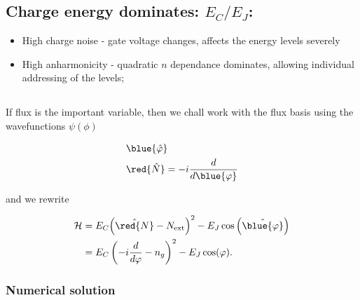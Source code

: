  \subsection{Charge energy dominates: $ E_C/E_J $:}
 \begin{itemize}
 \item High charge noise - gate voltage changes, affects the energy levels severely
 \item High anharmonicity - quadratic $ n $ dependance dominates, allowing individual addressing of the levels;
 \end{itemize}

 \newpage
 \subsection{}
 If flux is the important variable, then we chall work with the flux basis using the wavefunctions $ \psi(\phi) $

 \begin{framed}\noindent

   \begin{equation}
     \begin{aligned}
       &\blue{\hat{\varphi}} \qquad\\
       &\red{\hat{N}} = -i\frac{d}{d\blue{\varphi}}
     \end{aligned}
   \end{equation}

 \end{framed}
 \noindent and we rewrite

 \begin{equation}\label{eq:transmon-in-phase-basis}
   \begin{aligned}
     \mathcal{H} & = E_C{\left(\hat{\red{N}}-N_\text{ext}\right)^2}- E_J\cos\left(\hat{\blue{\varphi}}\right)\\
     & = E_C\left(-i\frac{d}{d\varphi} - n_g\right)^2 - E_J\cos(\varphi).
   \end{aligned}
 \end{equation}

 \subsubsection{Numerical solution}
 \label{sec:transmon-flux-numerical-solution}

